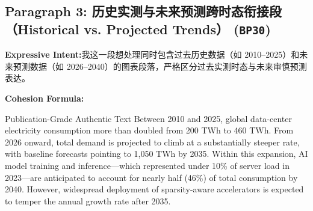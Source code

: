 \subsection*{Paragraph 3: 历史实测与未来预测跨时态衔接段（Historical vs. Projected Trends） (\texttt{BP30})}
\noindent\textbf{Expressive Intent:}\enspace 我这一段想处理同时包含过去历史数据（如 2010--2025）和未来预测数据（如 2026--2040）的图表段落，严格区分过去实测时态与未来审慎预测表达。\par
\noindent\textbf{Cohesion Formula:}\par\vspace{4pt}
\begin{ExampleBox}{Publication-Grade Authentic Text}
Between 2010 and 2025, global data-center electricity consumption more than doubled from 200 TWh to 460 TWh. From 2026 onward, total demand is projected to climb at a substantially steeper rate, with baseline forecasts pointing to 1,050 TWh by 2035. Within this expansion, AI model training and inference---which represented under 10\% of server load in 2023---are anticipated to account for nearly half (46\%) of total consumption by 2040. However, widespread deployment of sparsity-aware accelerators is expected to temper the annual growth rate after 2035.
\end{ExampleBox}
